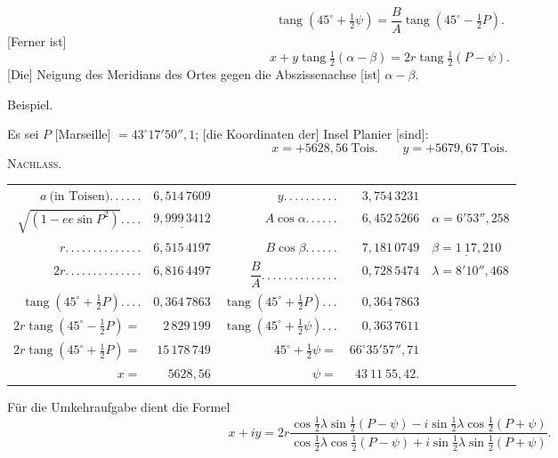 \[
\operatorname{tang}(45^\circ+\tfrac12\psi)=\frac BA\operatorname{tang}(45^\circ-\tfrac12P).
\]
[Ferner ist]
\[
x+y\operatorname{tang}\tfrac12(\alpha-\beta)=2r\operatorname{tang}\tfrac12(P-\psi).
\]
[Die] Neigung des Meridians des Ortes gegen die Abszissenachse [ist] $\alpha-\beta$.
\begin{center}Beispiel.\end{center}
Es sei $P$ [Marseille] $=43^\circ17'50''{,}1$; [die Koordinaten der] Insel Planier [sind]:
\[
x=+5628{,}56\ \text{Tois.}\qquad y=+5679{,}67\ \text{Tois.}
\]
\clearpage
{}\hfill\textsc{Nachlass.}\hfill\mbox{}\par{}
\begin{center}
\begingroup\fontsize{8}{12}\selectfont\setlength{\tabcolsep}{3pt}\renewcommand{\arraystretch}{1.4}
\begin{tabular}{@{}r@{ }r@{\quad}r@{ }r@{\quad}l@{}}
$a\ \text{(in Toisen)} .\,.\,.\,.\,.\,.$&$6{,}514\,7609$&$y.\,.\,.\,.\,.\,.\,.\,.\,.\,.$&$3{,}754\,3231$&\\
$\sqrt{(1-ee\sin P^2)}.\,.\,.\,.$&$\underline{9{,}999\,3412}$&$A\cos\alpha.\,.\,.\,.\,.\,.$&$6{,}452\,5266$&$\alpha=6'53''{,}258$\\
$r.\,.\,.\,.\,.\,.\,.\,.\,.\,.\,.\,.\,.\,.$&$6{,}515\,4197$&$B\cos\beta.\,.\,.\,.\,.\,.$&$7{,}181\,0749$&$\underline{\beta=1\ 17{,}210}$\\\cline{3-4}
$2r.\,.\,.\,.\,.\,.\,.\,.\,.\,.\,.\,.\,.\,.$&$6{,}816\,4497$&$\dfrac BA.\,.\,.\,.\,.\,.\,.\,.\,.\,.\,.\,.\,.\,.$&$0{,}728\,5474$&$\lambda=8'10''{,}468$\\
$\operatorname{tang}(45^\circ+\tfrac12P).\,.\,.\,.$&$0{,}364\,7863$&$\operatorname{tang}(45^\circ+\tfrac12P).\,.\,.$&$\underline{0{,}364\,7863}$&\\
$2r\operatorname{tang}(45^\circ-\tfrac12P)=$&$2\,829\,199$&$\operatorname{tang}(45^\circ+\tfrac12\psi).\,.\,.$&$0{,}363\,7611$&\\
$2r\operatorname{tang}(45^\circ+\tfrac12P)=$&$15\,178\,749$&$45^\circ+\tfrac12\psi=$&$66^\circ35'57''{,}71$&\\
$x=$&$5628{,}56$&$\psi=$&$43\ 11\ 55{,}42.$&
\end{tabular}\par\endgroup
\end{center}
Für die Umkehraufgabe dient die Formel
\[
x+iy=2r\frac{\cos\frac12\lambda\sin\frac12(P-\psi)-i\sin\frac12\lambda\cos\frac12(P+\psi)}{\cos\frac12\lambda\cos\frac12(P-\psi)+i\sin\frac12\lambda\sin\frac12(P+\psi)}.
\]
